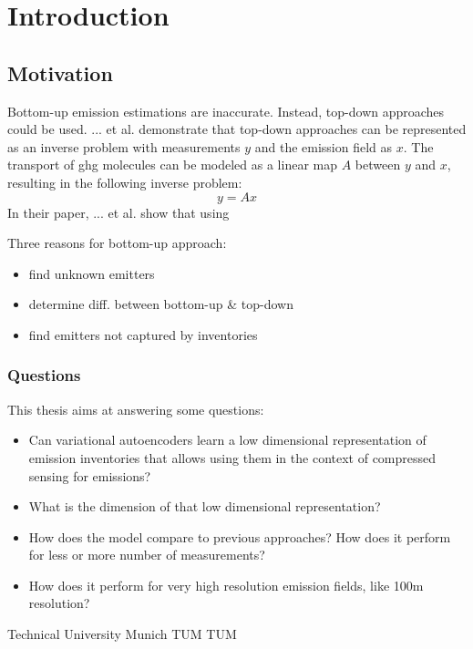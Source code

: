 
\chapter{Introduction}\label{chapter:introduction}

\section{Motivation}
Bottom-up emission estimations are inaccurate.
Instead, top-down approaches could be used.
... et al. demonstrate that top-down approaches can be represented as an inverse problem with measurements $y$ and the emission field as $x$.
The transport of ghg molecules can be modeled as a linear map $A$ between $y$ and $x$, resulting in the following inverse problem:
\begin{equation}
	y = Ax
\end{equation}
In their paper, ... et al. show that using

Three reasons for bottom-up approach:
\begin{itemize}
	\item find unknown emitters
	\item determine diff. between bottom-up \& top-down
	\item find emitters not captured by inventories
\end{itemize}

\subsection{Questions}
This thesis aims at answering some questions:
\begin{itemize}
	\item Can variational autoencoders learn a low dimensional representation of emission inventories that allows using them in the context of compressed sensing for emissions?
	\item What is the dimension of that low dimensional representation?
	\item How does the model compare to previous approaches? How does it perform for less or more number of measurements?
	\item How does it perform for very high resolution emission fields, like 100m resolution?
\end{itemize}

Technical University Munich \gls{TUM} \Gls{TUM}
